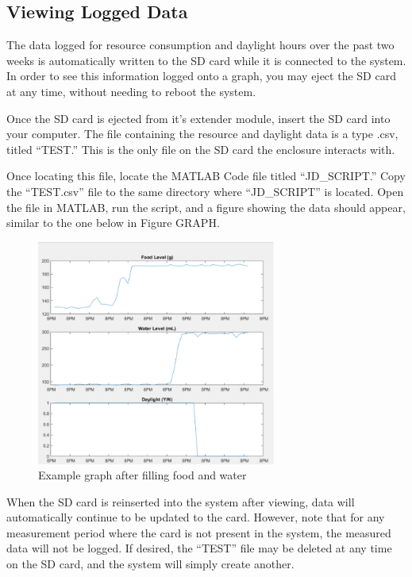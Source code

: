 \documentclass{article}
\begin{document}
\subsection{Viewing Logged Data}
The data logged for resource consumption and daylight hours over the past two weeks is automatically written to the SD card while it is connected to the system. In order to see this information logged onto a graph, you may eject the SD card at any time, without needing to reboot the system.

Once the SD card is ejected from it’s extender module, insert the SD card into your computer. The file containing the resource and daylight data is a type .csv, titled “TEST.” This is the only file on the SD card the enclosure interacts with.

Once locating this file, locate the MATLAB Code file titled “JD\_SCRIPT.” Copy the “TEST.csv” file to the same directory where “JD\_SCRIPT” is located. Open the file in MATLAB, run the script, and a figure showing the data should appear, similar to the one below in Figure GRAPH.

\begin{figure}[H]
    \centering
    \includegraphics[width=0.7\textwidth]{fig/example-graph.png}
    \caption{Example graph after filling food and water}
    \label{fig:example-graph}
\end{figure}

When the SD card is reinserted into the system after viewing, data will automatically continue to be updated to the card. However, note that for any measurement period where the card is not present in the system, the measured data will not be logged. If desired, the “TEST” file may be deleted at any time on the SD card, and the system will simply create another.
\newpage
\end{document}
